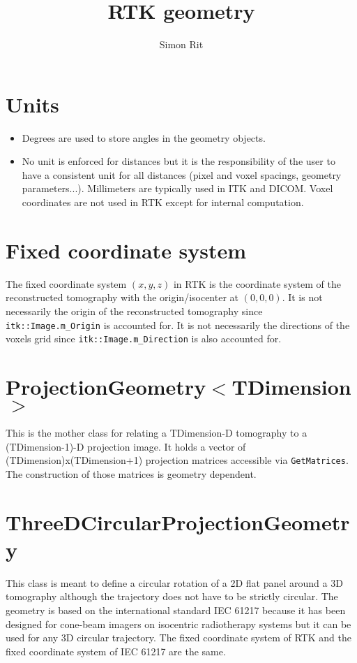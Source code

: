 \documentclass{article}
\begin{document}
\title{RTK geometry}
\author{Simon Rit}

\maketitle

\section{Units}

\begin{itemize}
 \item Degrees are used to store angles in the geometry objects.
 \item No unit is enforced for distances but it is the responsibility of the user to have a consistent unit for all distances (pixel and voxel spacings, geometry parameters...). Millimeters are typically used in ITK and DICOM. Voxel coordinates are not used in RTK except for internal computation.
\end{itemize}

\section{Fixed coordinate system}

The fixed coordinate system $(x,y,z)$ in RTK is the coordinate system of the reconstructed tomography with the origin/isocenter at $(0,0,0)$. It is not necessarily the origin of the reconstructed tomography since \verb+itk::Image.m_Origin+ is accounted for. It is not necessarily the directions of the voxels grid since \verb+itk::Image.m_Direction+ is also accounted for.

\section{ProjectionGeometry$<$TDimension$>$}

This is the mother class for relating a TDimension-D tomography to a (TDimension-1)-D projection image. It holds a vector of (TDimension)x(TDimension+1) projection matrices accessible via \verb+GetMatrices+. The construction of those matrices is geometry dependent.

\section{ThreeDCircularProjectionGeometry}

This class is meant to define a circular rotation of a 2D flat panel around a 3D tomography although the trajectory does not have to be strictly circular. The geometry is based on the international standard IEC 61217 because it has been designed for cone-beam imagers on isocentric radiotherapy systems but it can be used for any 3D circular trajectory. The fixed coordinate system of RTK and the fixed coordinate system of IEC 61217 are the same.
\end{document}
